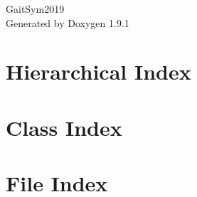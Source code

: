 \let\mypdfximage\pdfximage\def\pdfximage{\immediate\mypdfximage}\documentclass[twoside]{book}
\newcommand{\+}{\discretionary{\mbox{\scriptsize$\hookleftarrow$}}{}{}}
\newcommand{\clearemptydoublepage}{%
  \newpage{\pagestyle{empty}\cleardoublepage}%
}
\begin{document}
\raggedbottom

\hypersetup{pageanchor=false,
             bookmarksnumbered=true,
             pdfencoding=unicode
            }
\begin{titlepage}
\vspace*{7cm}
\begin{center}%
{\Large Gait\+Sym2019 }\\
\vspace*{1cm}
{\large Generated by Doxygen 1.9.1}\\
\end{center}
\end{titlepage}
\clearemptydoublepage
{}
\tableofcontents
\clearemptydoublepage
{}
\hypersetup{pageanchor=true}

\chapter{Hierarchical Index}

\chapter{Class Index}

\chapter{File Index}

\end{document}
